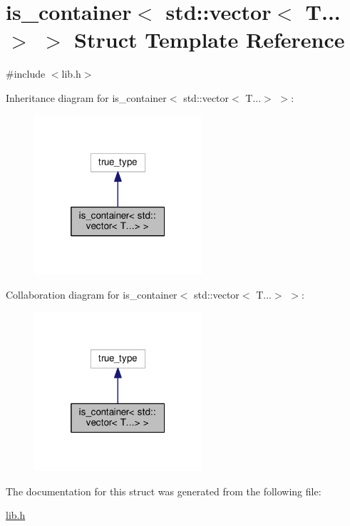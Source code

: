 \hypertarget{structis__container_3_01std_1_1vector_3_01T_8_8_8_4_01_4}{\section{is\-\_\-container$<$ std\-:\-:vector$<$ T...$>$ $>$ Struct Template Reference}
\label{structis__container_3_01std_1_1vector_3_01T_8_8_8_4_01_4}
}


{\ttfamily \#include $<$lib.\-h$>$}



Inheritance diagram for is\-\_\-container$<$ std\-:\-:vector$<$ T...$>$ $>$\-:
\nopagebreak
\begin{figure}[H]
\begin{center}
\leavevmode
\includegraphics[width=176pt]{structis__container_3_01std_1_1vector_3_01T_8_8_8_4_01_4__inherit__graph}
\end{center}
\end{figure}


Collaboration diagram for is\-\_\-container$<$ std\-:\-:vector$<$ T...$>$ $>$\-:
\nopagebreak
\begin{figure}[H]
\begin{center}
\leavevmode
\includegraphics[width=176pt]{structis__container_3_01std_1_1vector_3_01T_8_8_8_4_01_4__coll__graph}
\end{center}
\end{figure}


The documentation for this struct was generated from the following file\-:\begin{DoxyCompactItemize}
\item 
\hyperlink{lib_8h}{lib.\-h}\end{DoxyCompactItemize}
